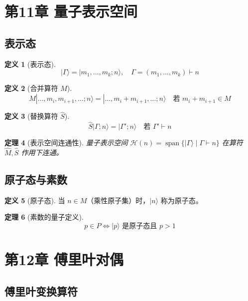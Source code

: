 \documentclass[12pt]{article}
\newtheorem{theorem}{定理}[section]
\theoremstyle{definition}
\newtheorem{definition}[theorem]{定义}
\begin{document}
\section{第11章 量子表示空间}

\subsection{表示态}

\begin{definition}[表示态]
\[
|\Gamma\rangle = |m_1,\dots,m_k;n\rangle,\quad \Gamma = (m_1,\dots,m_k) \vdash n
\]
\end{definition}

\begin{definition}[合并算符 \(\hat{M}\)]
\[
\hat{M}|\dots,m_i,m_{i+1},\dots;n\rangle = |\dots,m_i+m_{i+1},\dots;n\rangle \quad \text{若 } m_i+m_{i+1} \in M
\]
\end{definition}

\begin{definition}[替换算符 \(\hat{S}\)]
\[
\hat{S}|\Gamma;n\rangle = |\Gamma';n\rangle \quad \text{若 } \Gamma' \vdash n
\]
\end{definition}

\begin{theorem}[表示空间连通性]
量子表示空间 \(\mathcal{H}(n) = \operatorname{span}\{|\Gamma\rangle \mid \Gamma \vdash n\}\) 在算符 \(\hat{M}, \hat{S}\) 作用下连通。
\end{theorem}

\subsection{原子态与素数}

\begin{definition}[原子态]
当 \(n \in M\)（乘性原子集）时，\(|n\rangle\) 称为原子态。
\end{definition}

\begin{theorem}[素数的量子定义]
\[
p \in P \iff |p\rangle \text{ 是原子态且 } p>1
\]
\end{theorem}

\section{第12章 傅里叶对偶}

\subsection{傅里叶变换算符}
\end{document}
